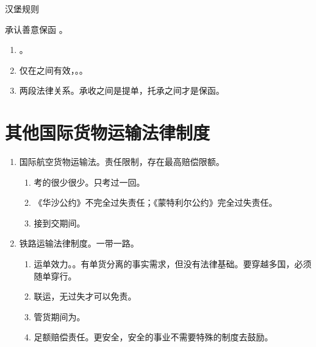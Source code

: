 \begin{enumerate}
\begin{enumerate}
\begin{kk}{汉堡规则}
                  \begin{kk}{承认善意保函}
                    。
                    \begin{enumerate}
                      \item {}。
                      \item 仅在之间有效，。。
                      \item 两段法律关系。承收之间是提单，托承之间才是保函。
                    \end{enumerate}
                  \end{kk}
                \end{kk}

        \end{enumerate}
\end{enumerate}

\section{其他国际货物运输法律制度}
\begin{enumerate}
  \item 国际航空货物运输法。责任限制，存在最高赔偿限额。
        \begin{enumerate}
          \item 考的很少很少。只考过一回。
          \item 《华沙公约》不完全过失责任；《蒙特利尔公约》完全过失责任。
          \item 接到交期间。
        \end{enumerate}
  \item 铁路运输法律制度。一带一路。
        \begin{enumerate}
          \item 运单效力。。有单货分离的事实需求，但没有法律基础。要穿越多国，必须随单穿行。
          \item 联运，无过失才可以免责。
          \item 管货期间为。
          \item 足额赔偿责任。更安全，安全的事业不需要特殊的制度去鼓励。
        \end{enumerate}
\end{enumerate}
